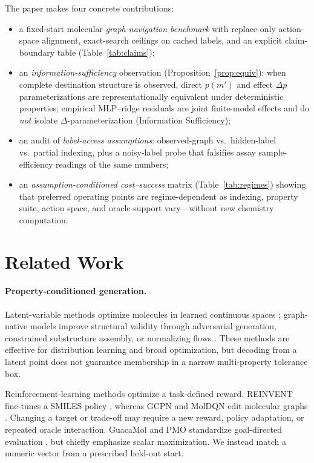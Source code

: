 \documentclass[journal=jcisd8,manuscript=article,email=false]{achemso}
\begin{document}
The paper makes four concrete contributions:
\begin{itemize}
  \item a fixed-start molecular \emph{graph-navigation benchmark} with replace-only action-space alignment, exact-search ceilings on cached labels, and an explicit claim-boundary table (Table~\ref{tab:claims});
  \item an \emph{information-sufficiency} observation (Proposition~\ref{prop:equiv}): when complete destination structure is observed, direct $p(m')$ and effect $\Delta p$ parameterizations are representationally equivalent under deterministic properties; empirical MLP--ridge residuals are joint finite-model effects and do \emph{not} isolate $\Delta$-parameterization (Information Sufficiency);
  \item an audit of \emph{label-access assumptions}: observed-graph vs.\ hidden-label vs.\ partial indexing, plus a noisy-label probe that falsifies assay sample-efficiency readings of the same numbers;
  \item an \emph{assumption-conditioned cost--success} matrix (Table~\ref{tab:regimes}) showing that preferred operating points are regime-dependent as indexing, property suite, action space, and oracle support vary---without new chemistry computation.
\end{itemize}

\section{Related Work}
\label{sec:related}

\paragraph{Property-conditioned generation.}
Latent-variable methods optimize molecules in learned continuous spaces \citep{gomez2018chemical}; graph-native models improve structural validity through adversarial generation, constrained substructure assembly, or normalizing flows \citep{decao2018molgan,jin2018jtvae,shi2020graphaf,zang2020moflow}. These methods are effective for distribution learning and broad optimization, but decoding from a latent point does not guarantee membership in a narrow multi-property tolerance box.

Reinforcement-learning methods optimize a task-defined reward. REINVENT fine-tunes a SMILES policy \citep{olivecrona2017reinvent}, whereas GCPN and MolDQN edit molecular graphs \citep{you2018gcpn,zhou2019moldqn}. Changing a target or trade-off may require a new reward, policy adaptation, or repeated oracle interaction. GuacaMol and PMO standardize goal-directed evaluation \citep{brown2019guacamol,gao2022pmo}, but chiefly emphasize scalar maximization. We instead match a numeric vector from a prescribed held-out start.
\end{document}
